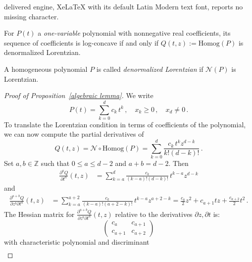 \documentclass[10pt,a4paper]{amsart}
\def\normal{\mathcal{N}}
\begin{document}
delivered engine, XeLaTeX with its default Latin Modern text font, reports no missing character.
\begin{proposition}\label{algebraic lemma}
For $P(t)$ a \emph{one-variable} polynomial with nonnegative real coefficients, its sequence of coefficients is log-concave if and only if $Q(t,z) := \mathrm{Homog}(P)$ is denormalized Lorentzian.
\end{proposition}

\begin{definition}
    A homogeneous polynomial $P$ is called \emph{denormalized Lorentzian} if $\normal(P)$ is Lorentzian.
\end{definition}

\begin{proof}[Proof of Proposition~\ref{algebraic lemma}]
We write 
$$
P(t) = \sum\limits_{k = 0}^{d} c_k\, t^k \,, \quad x_k \geq 0 \,, \quad x_d \neq 0 \,.
$$ 
To translate the Lorentzian condition in terms of coefficients of the polynomial, we can now compute the partial derivatives of $$Q(t,z) = \normal\circ\mathrm{Homog}(P) = \sum\limits_{k = 0}^{d} \frac{c_k\, t^k z^{d-k}}{k!(d-k)!}  \, .$$
Set $a,b \in \mathbb{Z}$ such that $0 \leq a \leq d-2$ and $a + b = d-2$. Then
\begin{align*}
 \frac{\partial^a Q}{\partial t^a} (t,z)   %
  & =  \sum\limits_{k = a}^{d} \frac{c_k}{(k-a)!(d-k)!} \, t^{k-a} z^{d-k}  
\end{align*}
and
\begin{align*}
 \frac{\partial^{a+b} Q}{\partial z^b \partial t^a} (t,z)   %
  & =  \sum\limits_{k = a}^{a+2} \frac{c_k}{(k-a)!(a+2-k)!} \, t^{k-a} z^{a+2-k}
  = \frac{c_a}{2} z^2 + c_{a+1} t z + \frac{c_{a+2}}{2} t^2 \,.
\end{align*}
The Hessian matrix for $\frac{\partial^{a+b} Q}{\partial z^b \partial t^a} (t,z)$ relative to the derivatives $\partial z, \partial t$ is:
\[
\begin{pmatrix}
    c_a                          & c_{a+1} \\
 c_{a+1}                      & c_{a+2}
\end{pmatrix}
\]
with characteristic polynomial and discriminant
\begin{align*}

\end{align*}
\end{proof}
\end{document}
